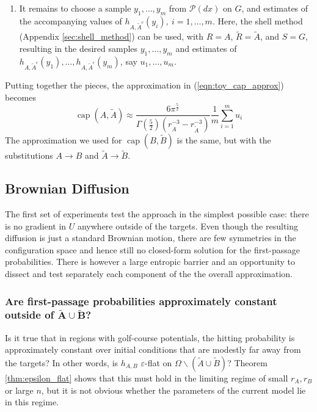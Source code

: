 \documentclass[nofootinbib,english, aip, jcp, priprint, graphicx,floatfix]{revtex4-1}
\theoremstyle{plain}
\theoremstyle{definition}
\theoremstyle{plain}
\newcommand{\capac}[2]{\ensuremath{\operatorname{cap}}(#1,#2)}
\newcommand{\PMeasure}{\mathscr{P}(dx)}
\newcommand{\dA}{{\dot A}}
\newcommand{\tA}{{\tilde A}}
\newcommand{\tB}{{\tilde B}}
\begin{document}
\begin{enumerate}
\item  It remains to choose a sample $y_1,\ldots,y_m$ from $\PMeasure$ on $G$, and estimates of the accompanying values of $h_{A,\tA^c}(y_i),\ i=1,\ldots,m$. Here, the shell method (Appendix \ref{sec:shell_method}) can be used, with $R=A$, $\tilde{R}=\tA$, and $S=G$, resulting in the desired samples $y_1,\ldots,y_m$ and estimates of $h_{A,\tA^c}(y_1),
\ldots,h_{A,\tA^c}(y_m)$,  say $u_1,\ldots,u_m$.

\end{enumerate}

Putting together the pieces, the approximation in (\ref{eqn:toy_cap_approx}) becomes
\begin{equation}
\label{eqn:approx_capacities}
\capac{A}{\tilde A} \approx
\frac{6\pi^{\frac{5}{2}}}
{\Gamma(\frac{5}{2})(r_\dA^{-3} - r_\tA^{-3})} 
\frac{1}{m}\sum_{i=1}^m u_i
\end{equation}
The approximation we used for $\capac{B}{\tB}$ is the same, but with the substitutions $A\to B$ and $\tA\to\tB$.

\subsection{Brownian Diffusion}
\label{sec:B_D}

The first set of experiments test the approach in the simplest possible case: there is no gradient in $U$ anywhere outside of the targets. Even though the resulting diffusion is just a standard Brownian motion, there are few symmetries in the configuration space and hence still no closed-form solution for the first-passage probabilities. There is however a large entropic barrier and an opportunity to dissect and test separately each component of the the overall approximation. 

\subsubsection{Are first-passage probabilities approximately constant outside of $\bm{\tA\cup\tB}$?}
\label{sec:toy_constant}
Is it true that in regions with golf-course potentials, the hitting probability is approximately constant over initial conditions that are modestly far away from the targets? In other words, is $h_{A,B}$  $\varepsilon$-flat on $\Omega\backslash(\tA\cup\tB)$?  Theorem \ref{thm:epsilon_flat} shows that this must hold in the limiting regime of small $r_A,r_B$ or large $n$, but it is not obvious whether the parameters of the current model lie in this regime.  
\end{document}
